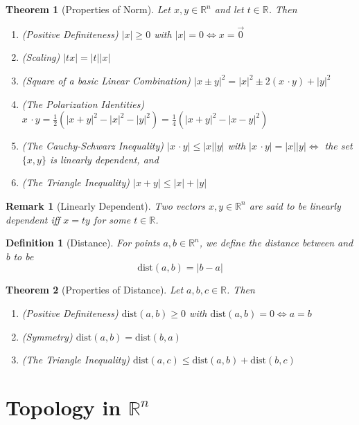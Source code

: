 \documentclass[11pt, oneside]{book}
\theoremstyle{break}
\newtheorem{thm}{Theorem}[section]
\newtheorem*{remark}{Remark}
\newtheorem{defn}{Definition}[section]
\newcommand{\bb}[1]{\mathbb{#1}}			%
\newcommand{\dotp}{\, \cdotp}				%
\begin{document}
\begin{thm}[Properties of Norm]
	Let $x, y \in \bb{R}^n$ and let $t \in \bb{R}$. Then
	\begin{enumerate}
		\item (Positive Definiteness) $|x| \geq 0$ with $|x| = 0 \iff x = \vec{0}$
		\item (Scaling) $|tx| = |t||x|$
		\item (Square of a basic Linear Combination) $|x \pm y|^2 = |x|^2 \pm 2(x \dotp y) + |y|^2$
		\item (The Polarization Identities) $x \dotp y = \frac{1}{2} (|x + y|^2 - |x|^2 - |y|^2) = \frac{1}{4} (|x + y|^2 - |x - y|^2)$
		\item (The Cauchy-Schwarz Inequality) $|x \dotp y| \leq |x||y|$ with $|x \dotp y| = |x||y| \iff $ the set $\{x, y\}$ is linearly dependent, and
		\item (The Triangle Inequality) $|x + y| \leq |x| + |y|$
	\end{enumerate}
\end{thm}

\begin{remark}[Linearly Dependent]
	Two vectors $x, y \in \bb{R}^n$ are said to be linearly dependent iff $x = ty$ for some $t \in \bb{R}$.
\end{remark}

\begin{defn}[Distance]
	For points $a, b \in \bb{R}^n$, we define the distance between and b to be
	\begin{equation*}
		\text{dist}(a, b) = |b - a|
	\end{equation*}
\end{defn}

\begin{thm}[Properties of Distance]
	Let $a, b, c \in \bb{R}$. Then
	\begin{enumerate}
		\item (Positive Definiteness) $\text{dist}(a, b) \geq 0$ with $\text{dist}(a, b) = 0 \iff a = b$
		\item (Symmetry) $\text{dist}(a, b) = \text{dist}(b, a)$
		\item (The Triangle Inequality) $\text{dist}(a, c) \leq \text{dist}(a, b) + \text{dist}(b, c)$
	\end{enumerate}
\end{thm}


\section{Topology in \texorpdfstring{$\bb{R}^n$}{Rn}}
\end{document}
